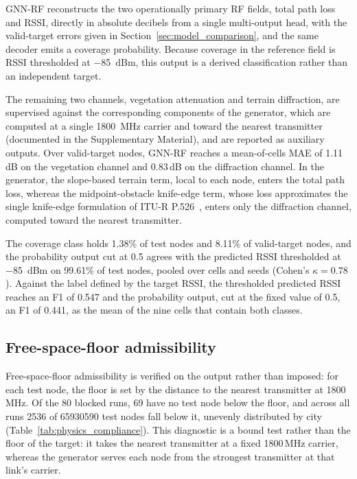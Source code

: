 \documentclass{ieeeaccess}
\begin{document}
GNN-RF reconstructs the two operationally primary RF fields, total path loss and RSSI, directly in absolute decibels from a single multi-output head, with the valid-target errors given in Section~\ref{sec:model_comparison}, and the same decoder emits a coverage probability. Because coverage in the reference field is RSSI thresholded at $-$85~dBm, this output is a derived classification rather than an independent target.

The remaining two channels, vegetation attenuation and terrain diffraction, are supervised against the corresponding components of the generator, which are computed at a single 1800~MHz carrier and toward the nearest transmitter (documented in the Supplementary Material), and are reported as auxiliary outputs. Over valid-target nodes, GNN-RF reaches a mean-of-cells MAE of 1.11\,dB on the vegetation channel and 0.83\,dB on the diffraction channel. In the generator, the slope-based terrain term, local to each node, enters the total path loss, whereas the midpoint-obstacle knife-edge term, whose loss approximates the single knife-edge formulation of ITU-R P.526~\cite{itu526}, enters only the diffraction channel, computed toward the nearest transmitter.

The coverage class holds 1.38\% of test nodes and 8.11\% of valid-target nodes, and the probability output cut at 0.5 agrees with the predicted RSSI thresholded at $-$85~dBm on 99.61\% of test nodes, pooled over cells and seeds (Cohen's $\kappa{=}0.78$). Against the label defined by the target RSSI, the thresholded predicted RSSI reaches an F1 of 0.547 and the probability output, cut at the fixed value of 0.5, an F1 of 0.441, as the mean of the nine cells that contain both classes.

\subsection{Free-space-floor admissibility}
\label{sec:physics_consistency}

Free-space-floor admissibility is verified on the output rather than imposed: for each test node, the floor is set by the distance to the nearest transmitter at 1800\,MHz. Of the 80 blocked runs, 69 have no test node below the floor, and across all runs \num{2536} of \num{65930590} test nodes fall below it, unevenly distributed by city (Table~\ref{tab:physics_compliance}). This diagnostic is a bound test rather than the floor of the target: it takes the nearest transmitter at a fixed 1800\,MHz carrier, whereas the generator serves each node from the strongest transmitter at that link's carrier.
\end{document}
